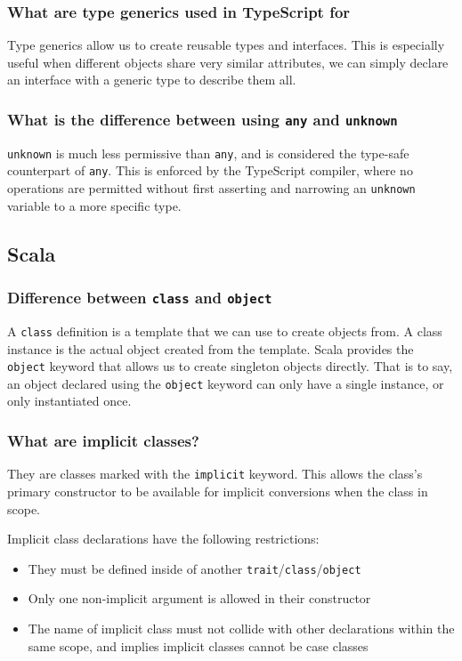 \documentclass[12pt, a4paper]{article}
\newcommand{\code}[1]{\texttt{#1}}
\begin{document}
\subsubsection*{What are type generics used in TypeScript for}
Type generics allow us to create reusable types and interfaces.
This is especially useful when different objects share very similar attributes, we can simply declare an interface with a generic type to describe them all.

\subsubsection*{What is the difference between using \code{any} and \code{unknown}}
\code{unknown} is much less permissive than \code{any}, and is considered the type-safe counterpart of \code{any}.
This is enforced by the TypeScript compiler, where no operations are permitted without first asserting and narrowing an \code{unknown} variable to a more specific type.

\pagebreak

\subsection*{Scala}

\subsubsection*{Difference between \code{class} and \code{object}}
A \code{class} definition is a template that we can use to create objects from.
A class instance is the actual object created from the template.
Scala provides the \code{object} keyword that allows us to create singleton objects directly.
That is to say, an object declared using the \code{object} keyword can only have a single instance, or only instantiated once.

\subsubsection*{What are implicit classes?}
They are classes marked with the \code{implicit} keyword.
This allows the class's primary constructor to be available for implicit conversions when the class in scope.\newline

Implicit class declarations have the following restrictions:
\begin{itemize}
  \item They must be defined inside of another \code{trait}/\code{class}/\code{object}
  \item Only one non-implicit argument is allowed in their constructor
  \item The name of implicit class must not collide with other declarations within the same scope, and implies implicit classes cannot be case classes
\end{itemize}
\end{document}

